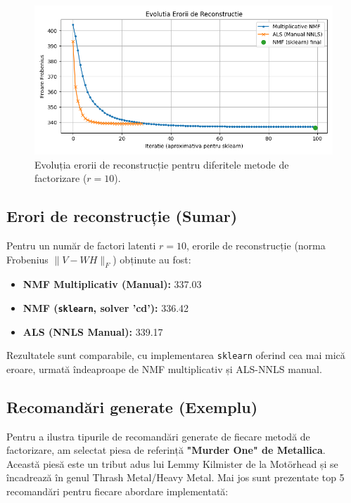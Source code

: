 \documentclass[12pt,a4paper]{article}
\begin{document}
	\begin{figure}[htbp]
		\centering
		\includegraphics[width=1.0\textwidth]{figure1.png}
		\caption{Evoluția erorii de reconstrucție pentru diferitele metode de factorizare ($r=10$).}
		\label{fig:error_plot}
	\end{figure}

	\subsection{Erori de reconstrucție (Sumar)}
	Pentru un număr de factori latenti $r=10$, erorile de reconstrucție (norma Frobenius $\|V - WH\|_F$) obținute au fost:
	\begin{itemize}
		\item \textbf{NMF Multiplicativ (Manual):} 337.03
		\item \textbf{NMF (\texttt{sklearn}, solver 'cd'):} 336.42
		\item \textbf{ALS (NNLS Manual):} 339.17
	\end{itemize}
	Rezultatele sunt comparabile, cu implementarea \texttt{sklearn} oferind cea mai mică eroare, urmată îndeaproape de NMF multiplicativ și ALS-NNLS manual.

	\subsection{Recomandări generate (Exemplu)}
	\label{subsec:recomandari-exemplu}

	Pentru a ilustra tipurile de recomandări generate de fiecare metodă de factorizare, am selectat piesa de referință \textbf{"Murder One" de Metallica}. Această piesă este un tribut adus lui Lemmy Kilmister de la Motörhead și se încadrează în genul Thrash Metal/Heavy Metal. Mai jos sunt prezentate top 5 recomandări pentru fiecare abordare implementată:
\end{document}
